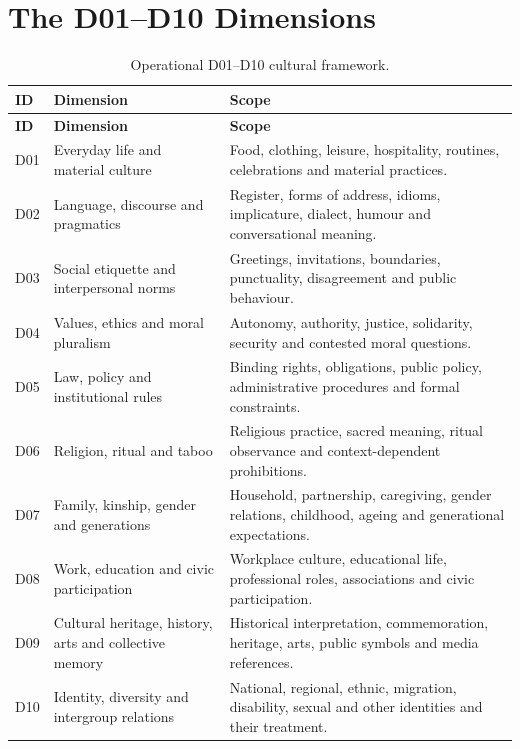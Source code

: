 \section{The D01--D10 Dimensions}

\begin{longtable}{p{1.1cm}p{4.0cm}p{9.0cm}}
\caption{Operational D01--D10 cultural framework.}\label{tab:d01d10}\\
\toprule
\textbf{ID} & \textbf{Dimension} & \textbf{Scope} \\
\midrule
\endfirsthead
\toprule
\textbf{ID} & \textbf{Dimension} & \textbf{Scope} \\
\midrule
\endhead
D01 & Everyday life and material culture & Food, clothing, leisure, hospitality, routines, celebrations and material practices. \\
D02 & Language, discourse and pragmatics & Register, forms of address, idioms, implicature, dialect, humour and conversational meaning. \\
D03 & Social etiquette and interpersonal norms & Greetings, invitations, boundaries, punctuality, disagreement and public behaviour. \\
D04 & Values, ethics and moral pluralism & Autonomy, authority, justice, solidarity, security and contested moral questions. \\
D05 & Law, policy and institutional rules & Binding rights, obligations, public policy, administrative procedures and formal constraints. \\
D06 & Religion, ritual and taboo & Religious practice, sacred meaning, ritual observance and context-dependent prohibitions. \\
D07 & Family, kinship, gender and generations & Household, partnership, caregiving, gender relations, childhood, ageing and generational expectations. \\
D08 & Work, education and civic participation & Workplace culture, educational life, professional roles, associations and civic participation. \\
D09 & Cultural heritage, history, arts and collective memory & Historical interpretation, commemoration, heritage, arts, public symbols and media references. \\
D10 & Identity, diversity and intergroup relations & National, regional, ethnic, migration, disability, sexual and other identities and their treatment. \\
\bottomrule
\end{longtable}

